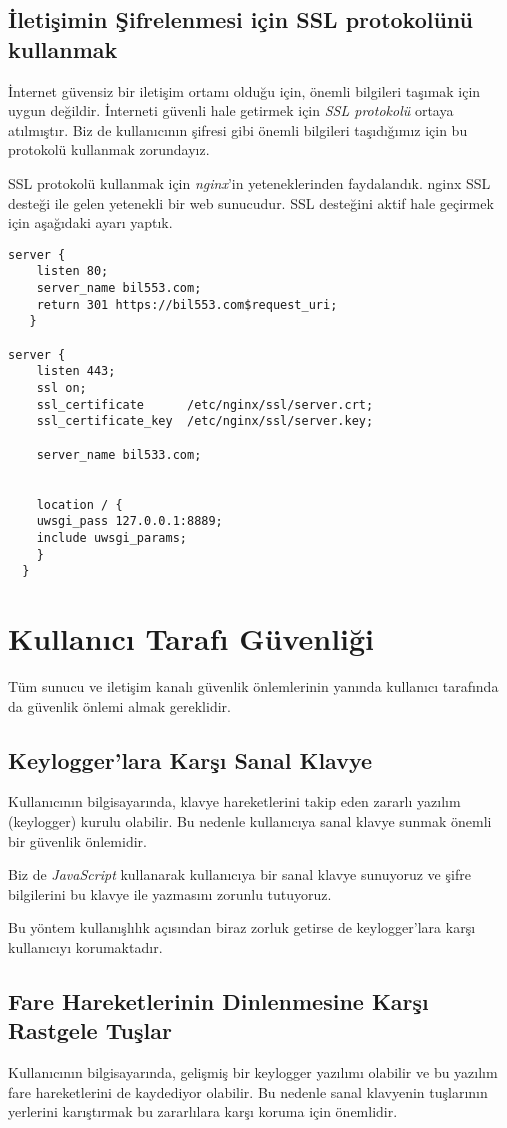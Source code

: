 \documentclass[11pt,a4paper]{report}
\begin{document}
\section{İletişimin Şifrelenmesi için SSL protokolünü kullanmak}
İnternet güvensiz bir iletişim ortamı olduğu için, önemli bilgileri taşımak için uygun değildir. İnterneti güvenli hale getirmek için \emph{SSL protokolü} ortaya atılmıştır. Biz de kullanıcının şifresi gibi önemli bilgileri taşıdığımız için bu protokolü kullanmak zorundayız.

SSL protokolü kullanmak için \emph{nginx}'in yeteneklerinden faydalandık. nginx SSL desteği ile gelen yetenekli bir web sunucudur. SSL desteğini aktif hale geçirmek için aşağıdaki ayarı yaptık.

\begin{lstlisting}[caption=nginx SSL ayarları]
 server {
    listen 80;
    server_name bil553.com;
    return 301 https://bil553.com$request_uri;
   }

server {
    listen 443;
    ssl on;
    ssl_certificate      /etc/nginx/ssl/server.crt;
    ssl_certificate_key  /etc/nginx/ssl/server.key;

    server_name bil533.com;


    location / {
	uwsgi_pass 127.0.0.1:8889;
	include uwsgi_params;
    }
  }
\end{lstlisting}

\chapter{Kullanıcı Tarafı Güvenliği}

Tüm sunucu ve iletişim kanalı güvenlik önlemlerinin yanında kullanıcı tarafında da güvenlik önlemi almak gereklidir.

\section{Keylogger'lara Karşı Sanal Klavye}
Kullanıcının bilgisayarında, klavye hareketlerini takip eden zararlı yazılım (keylogger) kurulu olabilir. Bu nedenle kullanıcıya sanal klavye sunmak önemli bir güvenlik önlemidir.

Biz de \emph{JavaScript} kullanarak kullanıcıya bir sanal klavye sunuyoruz ve şifre bilgilerini bu klavye ile yazmasını zorunlu tutuyoruz.

Bu yöntem kullanışlılık açısından biraz zorluk getirse de keylogger'lara karşı kullanıcıyı korumaktadır.

\section{Fare Hareketlerinin Dinlenmesine Karşı Rastgele Tuşlar}
Kullanıcının bilgisayarında, gelişmiş bir keylogger yazılımı olabilir ve bu yazılım fare hareketlerini de kaydediyor olabilir. Bu nedenle sanal klavyenin tuşlarının yerlerini karıştırmak bu zararlılara karşı koruma için önemlidir.
\end{document}
